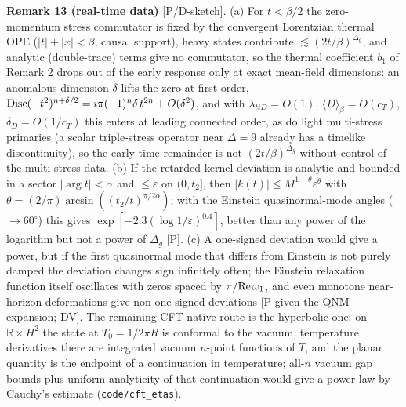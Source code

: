 \textbf{Remark 13 (real-time data)} [P/D-sketch]. (a) For $t<\beta/2$ the zero-momentum stress commutator is fixed by the convergent Lorentzian thermal OPE
($|t|+|x|<\beta$, causal support), heavy states contribute $\lesssim(2t/\beta)^{\Delta_g}$, and analytic (double-trace) terms give no commutator, so the
thermal coefficient $b_1$ of Remark 2 drops out of the early response only at exact mean-field dimensions: an anomalous dimension
$\delta$ lifts the zero at first order, ${\rm Disc}(-t^2)^{n+\delta/2}=i\pi(-1)^n\delta\,t^{2n}+O(\delta^2)$, and with $\lambda_{ttD}=O(1)$,
$\langle D\rangle_\beta=O(c_T)$, $\delta_D=O(1/c_T)$ this enters at leading connected order, as do light multi-stress primaries (a scalar triple-stress
operator near $\Delta=9$ already has a timelike discontinuity), so the early-time remainder is not $(2t/\beta)^{\Delta_g}$ without control of the
multi-stress data. (b) If the retarded-kernel deviation is
analytic and bounded in a sector $|\arg t|<\alpha$ and $\le\varepsilon$ on $(0,t_2]$, then $|k(t)|\le M^{1-\theta}\varepsilon^\theta$ with
$\theta=(2/\pi)\arcsin((t_2/t)^{\pi/2\alpha})$; with the Einstein quasinormal-mode angles ($\to60^\circ$) this gives $\exp[-2.3(\log1/\varepsilon)^{0.4}]$,
better than any power of the logarithm but not a power of $\Delta_g$ [P]. (c) A one-signed deviation would give a power, but if the first quasinormal mode
that differs from Einstein is not purely damped the deviation changes sign infinitely often; the Einstein relaxation function itself oscillates with
zeros spaced by $\pi/{\rm Re}\,\omega_1$, and even monotone near-horizon deformations give non-one-signed deviations [P given the QNM expansion; DV]. The
remaining CFT-native route is the hyperbolic one: on $\mathbb R\times H^2$ the state at $T_0=1/2\pi R$ is conformal to the vacuum, temperature derivatives
there are integrated vacuum $n$-point functions of $T$, and the planar quantity is the endpoint of a continuation in temperature; all-$n$ vacuum gap bounds
plus uniform analyticity of that continuation would give a power law by Cauchy's estimate (\texttt{code/cft\_etas}).

